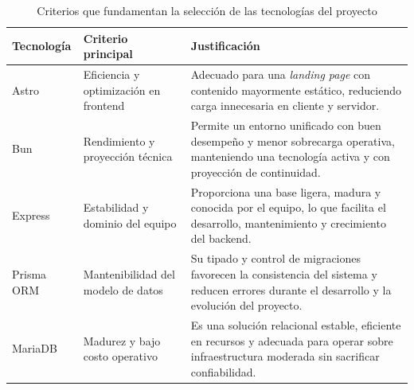 \begin{table}[H]
\centering
\caption[Criterios de selección de tecnologías]{Criterios que fundamentan la selección de las tecnologías del proyecto}
\label{tab:criterios_tecnologias}
\renewcommand{\arraystretch}{1.2}
\begin{tabular}{|p{2.8cm}|p{4.2cm}|p{6.5cm}|}
\hline
\textbf{Tecnología} & \textbf{Criterio principal} & \textbf{Justificación} \\ \hline
Astro & Eficiencia y optimización en frontend & Adecuado para una \emph{landing page} con contenido mayormente estático, reduciendo carga innecesaria en cliente y servidor. \\ \hline
Bun & Rendimiento y proyección técnica & Permite un entorno unificado con buen desempeño y menor sobrecarga operativa, manteniendo una tecnología activa y con proyección de continuidad. \\ \hline
Express & Estabilidad y dominio del equipo & Proporciona una base ligera, madura y conocida por el equipo, lo que facilita el desarrollo, mantenimiento y crecimiento del backend. \\ \hline
Prisma ORM & Mantenibilidad del modelo de datos & Su tipado y control de migraciones favorecen la consistencia del sistema y reducen errores durante el desarrollo y la evolución del proyecto. \\ \hline
MariaDB & Madurez y bajo costo operativo & Es una solución relacional estable, eficiente en recursos y adecuada para operar sobre infraestructura moderada sin sacrificar confiabilidad. \\ \hline
\end{tabular}
\end{table}